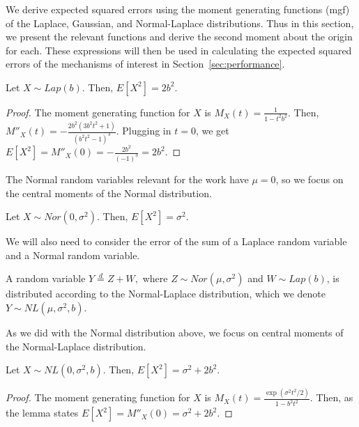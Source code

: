 We derive expected squared errors using the moment generating functions (mgf) of the Laplace, Gaussian, and Normal-Laplace distributions. Thus in this section, we present the relevant functions and derive the second moment about the origin for each. These expressions will then be used in calculating the expected squared errors of the mechanisms of interest in Section~\ref{sec:performance}. 

\begin{lem}
Let $X \sim Lap(b)$. Then, $E[X^2] = 2b^2.$
\end{lem}
\begin{proof}
The moment generating function for $X$ is $M_X(t) = \frac{1}{1 - t^2b^2}.$
Then, $M''_X(t) = -\frac{2b^2(3b^2t^2 + 1)}{(b^2t^2 - 1)^3}.$
Plugging in $t = 0$, we get 
$E[X^2] = M''_X(0) = -\frac{2b^2}{(-1)^3} = 2b^2.$
\end{proof}

The Normal random variables relevant for the work have $\mu = 0$, so we focus on the central moments of the Normal distribution.

\begin{lem}
Let $X \sim Nor(0, \sigma^2)$. Then,
$E[X^2] = \sigma^2.$
\end{lem}

We will also need to consider the error of the sum of a Laplace random variable and a Normal random variable. %
\begin{defn}
A random variable $Y \overset{d}{=} Z + W,$ where $Z \sim Nor(\mu, \sigma^2)$ and $W \sim Lap(b)$, is distributed according to the Normal-Laplace distribution, which we denote $Y \sim NL(\mu, \sigma^2, b)$.
\end{defn}

As we did with the Normal distribution above, we focus on central moments of the Normal-Laplace distribution.
\begin{lem}
\label{nl_secmom}
Let $X \sim NL(0, \sigma^2, b)$. Then, 
$E[X^2] = \sigma^2 + 2b^2.$
\end{lem}
\begin{proof}
The moment generating function for $X$ is
$M_X(t) = \frac{\exp(\sigma^2t^2/2)}{1 - b^2t^2}.$
Then, as the lemma states
$E[X^2] = M''_X(0) = \sigma^2 + 2b^2.$
\end{proof}

